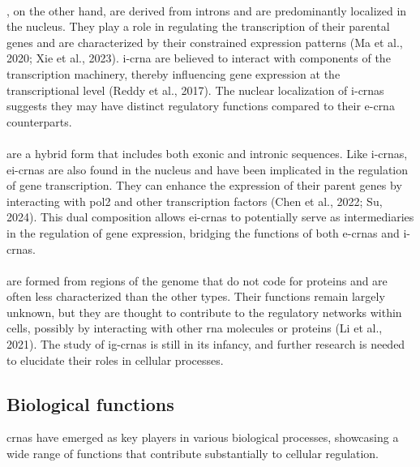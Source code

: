 \paragraph{}, on the other hand, are derived
from introns
and are predominantly localized in the nucleus.
They play a role in regulating the transcription of their parental genes and
are characterized by their constrained expression patterns (Ma et al., 2020;
Xie et al., 2023).
\gls{i-crna} are
believed to interact with components of the transcription machinery, thereby
influencing gene expression at the transcriptional level (Reddy et al., 2017).
The nuclear localization of \glspl{i-crna} suggests they may have distinct
regulatory functions compared to their \gls{e-crna} counterparts.

\paragraph{} are a hybrid form that
includes both
exonic and intronic sequences.
Like \glspl{i-crna}, \glspl{ei-crna} are also found in the nucleus and have
been implicated in the regulation of gene transcription.
They can enhance the expression of their parent genes by interacting with
\gls{pol2} and other transcription factors (Chen et al., 2022; Su, 2024).
This dual composition allows \glspl{ei-crna} to potentially serve as
intermediaries in the regulation of gene expression, bridging the functions of
both \glspl{e-crna} and \glspl{i-crna}.

\paragraph{} are formed from regions of
the
genome
that do not code for proteins and are often less characterized than the other
types.
Their functions remain largely unknown, but they are thought to contribute to
the regulatory networks within cells, possibly by interacting with other
\gls{rna} molecules or proteins (Li et al., 2021).
The study of \glspl{ig-crna} is still in its infancy, and further research is
needed to elucidate their roles in cellular processes.

\subsection{Biological functions}
\label{sec:circrna_functions}
\glspl{crna} have emerged as key players in various biological processes,
showcasing
a wide range of functions that contribute substantially to cellular regulation.

